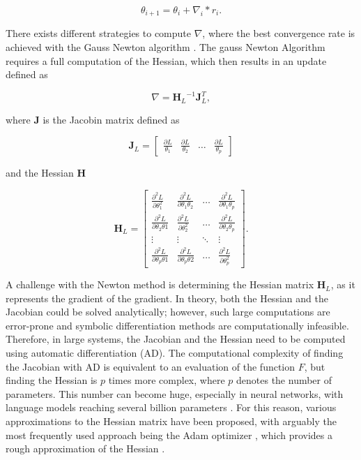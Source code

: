 \documentclass{article}
\begin{document}
\begin{equation}
    \theta_{i+1} = \theta_{i} + \nabla_i * r_i.
\end{equation}

There exists different strategies to compute $\nabla$, where the best convergence rate is achieved with the Gauss Newton algorithm \citep{thuerey2021physics}. The gauss Newton Algorithm requires a full computation of the Hessian, which then results in an update defined as

\begin{equation}
    \nabla = {\mathbf{H}_L}^{-1} \mathbf{J}_L^{T},
\end{equation}

where $\mathbf{J}$ is the Jacobin matrix defined as 

\begin{equation}
    \mathbf{J}_L = \begin{bmatrix}
        \frac{\partial L}{\theta_1} & \frac{\partial L}{\theta_2} & \dots &\frac{\partial L}{\theta_p}
    \end{bmatrix}
\end{equation}

and the Hessian $\mathbf{H}$

\begin{equation}
    \mathbf{H}_L = \begin{bmatrix}
        \frac{\partial^2 L}{\partial \theta_1^2} & \frac{\partial^2 L}{\partial \theta_1 \theta_2} & \dots & \frac{\partial^2 L}{\partial \theta_1 \theta_p} \\ 
        \frac{\partial^2 L}{\partial \theta_2 \theta 1} & \frac{\partial^2 L}{\partial \theta_2^2} & \dots & \frac{\partial^2 L}{\partial \theta_2 \theta_p} \\
        \vdots & \vdots & \ddots & \vdots \\ 
        \frac{\partial^2 L}{\partial \theta_p \theta 1} & \frac{\partial^2 L}{\partial \theta_p \theta 2} & \dots & \frac{\partial^2 L}{\partial \theta_p^2}
    \end{bmatrix}.
\end{equation}

A challenge with the Newton method is determining the Hessian matrix $\mathbf{H}_L$, as it represents the gradient of the gradient. In theory, both the Hessian and the Jacobian could be solved analytically; however, such large computations are error-prone and symbolic differentiation methods are computationally infeasible. Therefore, in large systems, the Jacobian and the Hessian need to be computed using automatic differentiation (AD). The computational complexity of finding the Jacobian with AD is equivalent to an evaluation of the function $F$, but finding the Hessian is $p$ times more complex, where $p$ denotes the number of parameters. This number can become huge, especially in neural networks, with language models reaching several billion parameters \citep{jiang2023mistral}. For this reason, various approximations to the Hessian matrix have been proposed, with arguably the most frequently used approach being the Adam optimizer \citep{kingma2014adam}, which provides a rough approximation of the Hessian \citep{thuerey2021physics}.
\end{document}

